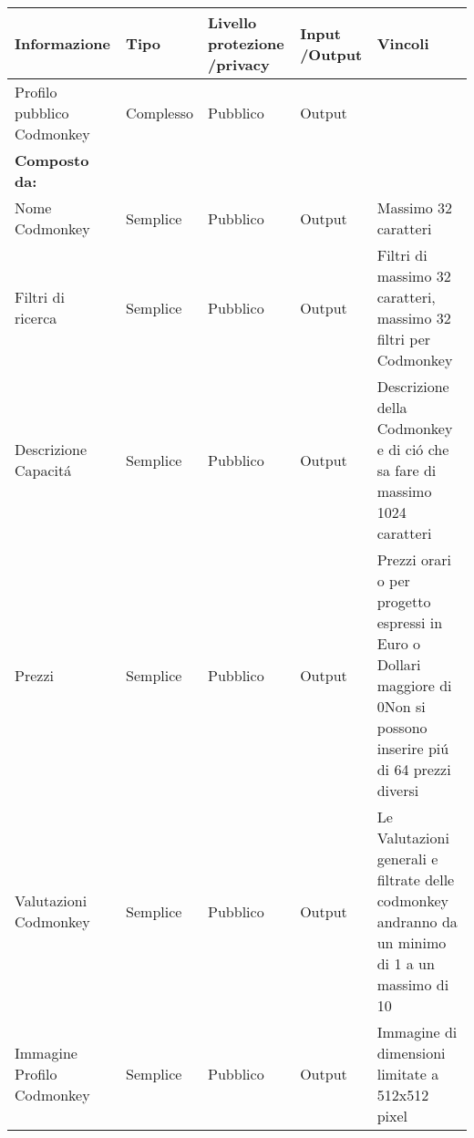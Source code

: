 \begin{center}
    \pagebreak %


    \begin{tabular}
        {|>{\centering}m{2.8cm}|>{\centering}m{1.65cm}|>{\centering}m{2.7cm}|>{\centering}m{2.3cm}|>{\raggedright}m{3.85cm}|}
        \hline  \rowcolor{tableGreen!70}
        \multicolumn{5}{|c|}{\Large\textbf{Homepage}}
        \n      \rowcolor{tableGreen!50}
        \large \textbf{Informazione}               & \large\textbf{Tipo} & \large\textbf{Livello protezione /privacy} & \large\textbf{Input /Output} & \centering\large\textbf{Vincoli}\tabularnewline
        \hline     Profilo pubblico Codmonkey      & Complesso           & Pubblico                                   & Output                       &
        \tabularnewline \textbf{Composto da:}      &                     &                                            &                              &
        \tabularnewline Nome Codmonkey             & Semplice            & Pubblico                                   & Output                       & Massimo 32 caratteri
        \tabularnewline Filtri di ricerca          & Semplice            & Pubblico                                   & Output                       & Filtri di massimo 32 caratteri, massimo 32 filtri per Codmonkey
        \tabularnewline Descrizione Capacitá       & Semplice            & Pubblico                                   & Output                       & Descrizione della Codmonkey e di ció che sa fare di massimo 1024 caratteri
        \tabularnewline Prezzi                     & Semplice            & Pubblico                                   & Output                       & Prezzi orari o per progetto espressi in Euro o Dollari maggiore di 0\newline Non si possono inserire piú di 64 prezzi diversi
        \tabularnewline Valutazioni Codmonkey      & Semplice            & Pubblico                                   & Output                       & Le Valutazioni generali e filtrate delle codmonkey andranno da un minimo di 1 a un massimo di 10
        \tabularnewline Immagine Profilo Codmonkey & Semplice            & Pubblico                                   & Output                       & Immagine di dimensioni limitate a 512x512 pixel
        \n
    \end{tabular}
    \label{tab:monkeytable:problema:tabFlusso:Homepage}


    \phantom{M} %



\end{center}
